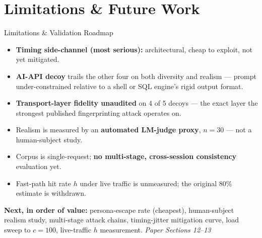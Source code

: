 \documentclass[aspectratio=169, 11pt]{beamer}
\newcommand{\srcnote}[1]{{\footnotesize\color{gray}\textit{#1}}}
\begin{document}
\section{Limitations \& Future Work}
\begin{frame}{Limitations \& Validation Roadmap}
    \begin{itemize}
        \item \textbf{Timing side-channel (most serious):} architectural, cheap to exploit, not yet mitigated.
        \item \textbf{AI-API decoy} trails the other four on both diversity and realism --- prompt under-constrained relative to a shell or SQL engine's rigid output format.
        \item \textbf{Transport-layer fidelity unaudited} on 4 of 5 decoys --- the exact layer the strongest published fingerprinting attack operates on.
        \item Realism is measured by an \textbf{automated LM-judge proxy}, $n=30$ --- not a human-subject study.
        \item Corpus is single-request; \textbf{no multi-stage, cross-session consistency} evaluation yet.
        \item Fast-path hit rate $h$ under live traffic is unmeasured; the original 80\% estimate is withdrawn.
    \end{itemize}
    \vspace{2mm}
    \textbf{Next, in order of value:} persona-escape rate (cheapest), human-subject realism study, multi-stage attack chains, timing-jitter mitigation curve, load sweep to $c{=}100$, live-traffic $h$ measurement.
    \srcnote{Paper Sections 12--13}
\end{frame}

\end{document}
